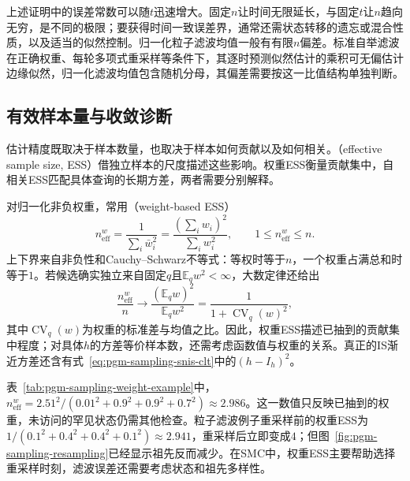 上述证明中的误差常数可以随$t$迅速增大。固定$n$让时间无限延长，与固定$t$让$n$趋向无穷，是不同的极限；要获得时间一致误差界，通常还需状态转移的遗忘或混合性质，以及适当的似然控制。归一化粒子滤波均值一般有有限$n$偏差。标准自举滤波在正确权重、每轮多项式重采样等条件下，其逐时预测似然估计的乘积可无偏估计边缘似然，归一化滤波均值包含随机分母，其偏差需要按这一比值结构单独判断。

\subsection{有效样本量与收敛诊断}
\label{sec:pgm-sampling-diagnostics}

估计精度既取决于样本数量，也取决于样本如何贡献以及如何相关。（effective sample size, ESS）借独立样本的尺度描述这些影响。权重ESS衡量贡献集中，自相关ESS匹配具体查询的长期方差，两者需要分别解释。

对归一化非负权重，常用（weight-based ESS）
\begin{equation}
  n_{\mathrm{eff}}^{w}
    =\frac{1}{\sum_i\bar w_i^2}
    =\frac{(\sum_i w_i)^2}{\sum_i w_i^2},
  \qquad 1\leq n_{\mathrm{eff}}^{w}\leq n.
  \label{eq:pgm-sampling-weight-ess}
\end{equation}
上下界来自非负性和Cauchy--Schwarz不等式：等权时等于$n$，一个权重占满总和时等于$1$。若候选确实独立来自固定$q$且$\mathbb{E}_q w^2<\infty$，大数定律还给出
\[
  \frac{n_{\mathrm{eff}}^{w}}{n}
    \longrightarrow
    \frac{(\mathbb{E}_q w)^2}{\mathbb{E}_q w^2}
    =\frac{1}{1+\operatorname{CV}_q(w)^2},
\]
其中$\operatorname{CV}_q(w)$为权重的标准差与均值之比。因此，权重ESS描述已抽到的贡献集中程度；对具体$h$的方差等价样本数，还需考虑函数值与权重的关系。真正的IS渐近方差还含有式~\eqref{eq:pgm-sampling-snis-clt}中的$(h-I_h)^2$。

表~\ref{tab:pgm-sampling-weight-example}中，$n_{\mathrm{eff}}^w=2.51^2/(0.01^2+0.9^2+0.9^2+0.7^2)\approx2.986$。这一数值只反映已抽到的权重，未访问的罕见状态仍需其他检查。粒子滤波例子重采样前的权重ESS为$1/(0.1^2+0.4^2+0.4^2+0.1^2)\approx2.941$，重采样后立即变成$4$；但图~\ref{fig:pgm-sampling-resampling}已经显示祖先反而减少。在SMC中，权重ESS主要帮助选择重采样时刻，滤波误差还需要考虑状态和祖先多样性。

